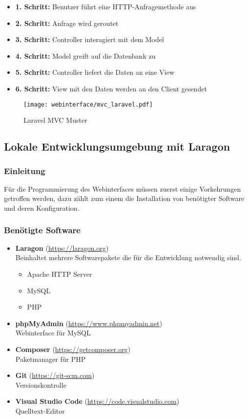 \begin{itemize}
  \item \textbf{1. Schritt:} Benutzer führt eine HTTP-Anfragemethode aus
  \item \textbf{2. Schritt:} Anfrage wird geroutet
  \item \textbf{3. Schritt:} Controller interagiert mit dem Model
  \item \textbf{4. Schritt:} Model greift auf die Datenbank zu
  \item \textbf{5. Schritt:} Controller liefert die Daten an eine View
  \item \textbf{6. Schritt:} View mit den Daten werden an den Client gesendet
\end{itemize}

\begin{figure}[H]
  \centering
  \texttt{[image: webinterface/mvc\_laravel.pdf]}
  \caption{Laravel MVC Muster}
\end{figure}

\subsection{Lokale Entwicklungsumgebung mit Laragon}
\subsubsection{Einleitung}
Für die Programmierung des Webinterfaces müssen zuerst einige Vorkehrungen
getroffen werden, dazu zählt zum einem die Installation von benötigter Software
und deren Konfiguration.

\subsubsection{Benötigte Software}

\begin{itemize}
  \item \textbf{Laragon} (\url{https://laragon.org}) \\Beinhaltet mehrere
        Softwarepakete die für die Entwicklung notwendig sind.
        \begin{itemize}
          \item Apache HTTP Server
          \item MySQL
          \item PHP
        \end{itemize}
  \item \textbf{phpMyAdmin} (\url{https://www.phpmyadmin.net}) \\ Webinterface
        für MySQL
  \item \textbf{Composer} (\url{https://getcomposer.org}) \\ Paketmanager für
        PHP
  \item \textbf{Git} (\url{https://git-scm.com}) \\ Versionskontrolle
  \item \textbf{Visual Studio Code} (\url{https://code.visualstudio.com}) \\
        Quelltext-Editor
\end{itemize}


